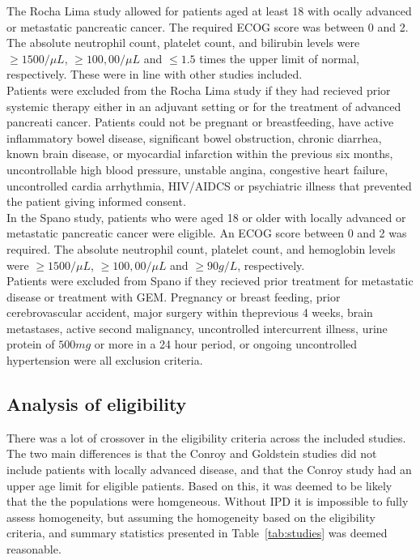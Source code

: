 The Rocha Lima study allowed for patients aged at least 18 with ocally advanced or metastatic pancreatic cancer. The required ECOG score was between 0 and 2. The absolute neutrophil count, platelet count, and bilirubin levels were $\geq 1500/\mu L$, $\geq 100,00/\mu L$ and $\leq 1.5$ times the upper limit of normal, respectively. These were in line with other studies included. \\

Patients were excluded from the Rocha Lima study if they had recieved prior systemic therapy either in an adjuvant setting or for the treatment of advanced pancreati cancer. Patients could not be pregnant or breastfeeding, have active inflammatory bowel disease, significant bowel obstruction, chronic diarrhea, known brain disease, or myocardial infarction within the previous six months, uncontrollable high blood pressure, unstable angina, congestive heart failure, uncontrolled cardia arrhythmia, HIV/AIDCS or psychiatric illness that prevented the patient giving informed consent. \\

In the Spano study, patients who were aged 18 or older with locally advanced or metastatic pancreatic cancer were eligible. An ECOG score between 0 and 2 was required. The absolute neutrophil count, platelet count, and hemoglobin levels were $\geq 1500/\mu L$, $\geq 100,00/\mu L$ and $\geq 90g/L$, respectively. \\

Patients were excluded from Spano if they recieved prior treatment for metastatic disease or treatment with GEM. Pregnancy or breast feeding, prior
cerebrovascular accident, major surgery within theprevious 4 weeks, brain metastases, active second malignancy, uncontrolled intercurrent illness, urine
protein of $500mg$ or more in a 24 hour period, or ongoing uncontrolled hypertension were all exclusion criteria.

\subsection{Analysis of eligibility}
There was a lot of crossover in the eligibility criteria across the included studies. The two main differences is that the Conroy and Goldstein studies did not include patients with locally advanced disease, and that the Conroy study had an upper age limit for eligible patients. Based on this, it was deemed to be likely that the the populations were homgeneous. Without IPD it is impossible to fully assess homogeneity, but assuming the homogeneity based on the eligibility criteria, and summary statistics presented in Table~\ref{tab:studies} was deemed reasonable.

